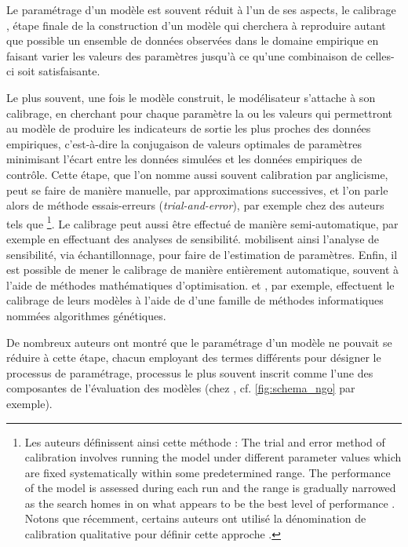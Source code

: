 Le paramétrage d'un modèle est souvent réduit à l'un de ses aspects, le \og calibrage \fg, étape finale de la construction d'un modèle qui cherchera à reproduire autant que possible un ensemble de données observées dans le domaine empirique en faisant varier les valeurs des paramètres jusqu'à ce qu'une combinaison de celles-ci soit satisfaisante.

Le plus souvent, une fois le modèle construit, le modélisateur s'attache à son \og calibrage\fg{}, en cherchant pour chaque paramètre la ou les valeurs qui permettront au modèle de produire les indicateurs de sortie les plus proches des données empiriques, c'est-à-dire la conjugaison de \og valeurs optimales\fg{} de paramètres minimisant l'écart entre les données simulées et les données empiriques de contrôle.
Cette étape, que l'on nomme aussi souvent calibration par anglicisme, peut se faire de manière manuelle, par approximations successives, et l'on parle alors de méthode \og essais-erreurs\fg{} (\textit{trial-and-error}), par exemple chez des auteurs tels que \textcite{batty_spatial_1973}\footnote{
	Les auteurs définissent ainsi cette méthode : \og
	The trial and error method of calibration involves running the model under different parameter values which are fixed systematically within some predetermined range.
	The performance of the model is assessed during each run and the range is gradually narrowed as the search homes in on what appears to be the best level of performance\fg{} \autocite[356]{batty_spatial_1973}.
	Notons que récemment, certains auteurs ont utilisé la dénomination de \og calibration qualitative\fg{} pour définir cette approche \autocite[253]{crooks_agent-based_2019}.
}.
Le calibrage peut aussi être effectué de manière semi-automatique, par exemple en effectuant des analyses de sensibilité.
\textcite[\S2.3--2.4]{thiele_facilitating_2014} mobilisent ainsi l'analyse de sensibilité, via échantillonnage, pour faire de l'estimation de paramètres.
Enfin, il est possible de mener le calibrage de manière entièrement automatique, souvent à l'aide de méthodes mathématiques d'optimisation.
\textcite{heppenstall_genetic_2007} et \textcite[188]{ngo_calibration_2012}, par exemple, effectuent le calibrage de leurs modèles à l'aide de d'une famille de méthodes informatiques nommées \og algorithmes génétiques\fg{}.

De nombreux auteurs ont montré que le paramétrage d'un modèle ne pouvait se réduire à cette étape, chacun employant des termes différents pour désigner le processus de paramétrage, processus le plus souvent inscrit comme l'une des composantes de l'évaluation des modèles (chez \textcite{ngo_calibration_2012}, cf. \cref{fig:schema_ngo} par exemple).

